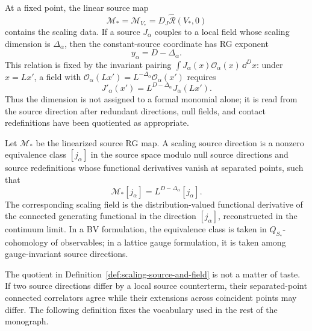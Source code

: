 At a fixed point, the linear source map
\begin{equation}
  \mathcal M_\ast=\mathcal M_{V_\ast}
  =
  D_J\widehat{\mathcal R}(V_\ast,0)
  \label{eq:linear-source-rg-map}
\end{equation}
contains the scaling data.  If a source \(J_\alpha\) couples to a local field
whose scaling dimension is \(\Delta_\alpha\), then the constant-source
coordinate has RG exponent
\begin{equation}
  y_\alpha=D-\Delta_\alpha .
  \label{eq:source-exponent-operator-dimension}
\end{equation}
This relation is fixed by the invariant pairing
\(\int J_\alpha(x)\mathcal O_\alpha(x)\,\dd^Dx\): under
\(x=Lx'\), a field with
\(\mathcal O_\alpha(Lx')=L^{-\Delta_\alpha}\mathcal O_\alpha(x')\) requires
\begin{equation}
  J'_\alpha(x')=L^{D-\Delta_\alpha}J_\alpha(Lx').
  \label{eq:source-rescaling-from-pairing}
\end{equation}
Thus the dimension is not assigned to a formal monomial alone; it is read
from the source direction after redundant directions, null fields, and
contact redefinitions have been quotiented as appropriate.

\begin{definition}
\label{def:scaling-source-and-field}
Let \(\mathcal M_\ast\) be the linearized source RG map.  A scaling source
direction is a nonzero equivalence class \([j_\alpha]\) in the source space
modulo null source directions and source redefinitions whose functional
derivatives vanish at separated points, such that
\begin{equation}
  \mathcal M_\ast [j_\alpha]
  =
  L^{D-\Delta_\alpha}[j_\alpha].
  \label{eq:scaling-source-eigenvalue}
\end{equation}
The corresponding scaling field is the distribution-valued functional
derivative of the connected generating functional in the direction
\([j_\alpha]\), reconstructed in the continuum limit.  In a BV formulation,
the equivalence class is taken in \(Q_{S_\ast}\)-cohomology of observables;
in a lattice gauge formulation, it is taken among gauge-invariant source
directions.
\end{definition}

The quotient in Definition~\ref{def:scaling-source-and-field} is not a
matter of taste.  If two source directions differ by a local source
counterterm, their separated-point connected correlators agree while their
extensions across coincident points may differ.  The following definition
fixes the vocabulary used in the rest of the monograph.

